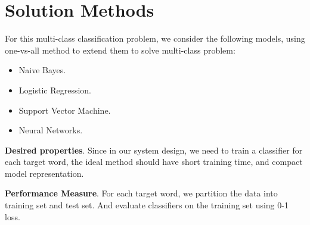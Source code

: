 \section{Solution Methods}

For this multi-class classification problem, we consider the following models,
using one-vs-all method to extend them to solve multi-class problem:
\begin{itemize}
  \item Naive Bayes.
  \item Logistic Regression.
  \item Support Vector Machine.
  \item Neural Networks.
\end{itemize}

\textbf{Desired properties}. Since in our system design, we need to train a
classifier for each target word, the ideal method should have short training
time, and compact model representation.

\textbf{Performance Measure}. For each target word, we partition the data into
training set and test set. And evaluate classifiers on the training set using
0-1 loss.
